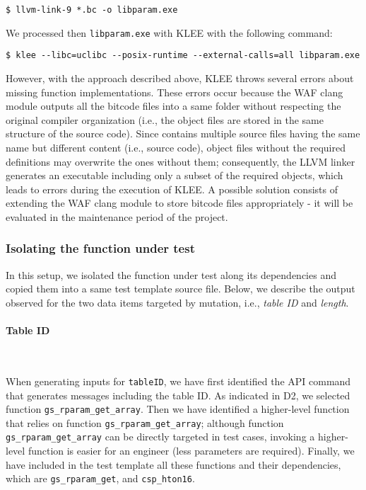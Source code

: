 \begin{lstlisting}[style=CStyle]
$ llvm-link-9 *.bc -o libparam.exe
\end{lstlisting}

We processed then \texttt{libparam.exe} with KLEE with the following command:

\begin{lstlisting}[style=CStyle]
$ klee --libc=uclibc --posix-runtime --external-calls=all libparam.exe
\end{lstlisting}

However, with the approach described above, KLEE throws several errors about missing function implementations. These errors occur because the WAF clang module outputs all the bitcode files into a same folder without respecting the original compiler organization (i.e., the object files are stored in the same structure of the source code). Since \PARAM contains multiple source files having the same name but different content (i.e., source code), object files without the required definitions may overwrite the ones without them; consequently, the LLVM linker generates an executable including only a subset of the required objects, which leads to errors during the execution of KLEE. A possible solution consists of extending the WAF clang module to store bitcode files appropriately - it will be evaluated in the maintenance period of the project.


\subsubsection{Isolating the function under test}

In this setup, we isolated the function under test along its dependencies and copied them into a same test template source file. Below, we describe the output observed for the two data items targeted by mutation, i.e.,
\emph{table ID} and \emph{length}.


\paragraph{Table ID}\ 

When generating inputs for \texttt{tableID}, we have first identified the API command that generates messages including the table ID. As indicated in D2, we selected function 
\texttt{gs\_rparam\_get\_array}. Then we have identified a higher-level function that relies on function 
\texttt{gs\_rparam\_get\_array}; although function \texttt{gs\_rparam\_get\_array} can be directly targeted in test cases, invoking a higher-level function is easier for an engineer (less parameters are required).
Finally, we have included in the test template all these functions and their dependencies, which are \texttt{gs\_rparam\_get}, and \texttt{csp\_hton16}. 

